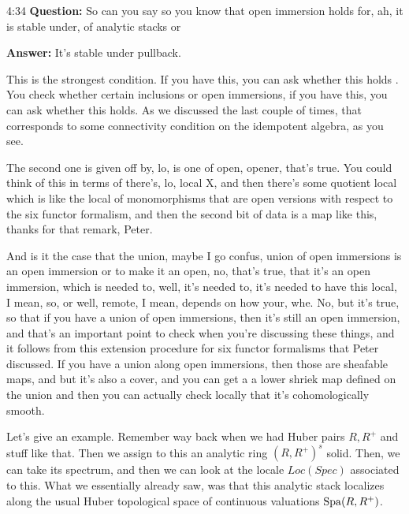 \begin{unfinished}{4:34}
\textbf{Question:} So can you say so you know that open immersion holds for, ah, it is stable under, of analytic stacks or 

\textbf{Answer:} It's stable under pullback.

This is the strongest condition. If you have this, you can ask whether this holds . You check whether certain inclusions or open immersions, if you have this, you can ask whether this holds. As we discussed the last couple of times, that corresponds to some connectivity condition on the idempotent algebra, as you see. 


The second one is given off by, lo, is one of open, opener, that's true. You could think of this in terms of there's, lo, local X, and then there's some quotient local which is like the local of monomorphisms that are open versions with respect to the six functor formalism, and then the second bit of data is a map like this, thanks for that remark, Peter.

And is it the case that the union, maybe I go confus, union of open immersions is an open immersion or to make it an open, no, that's true, that it's an open immersion, which is needed to, well, it's needed to, it's needed to have this local, I mean, so, or well, remote, I mean, depends on how your, whe. No, but it's true, so that if you have a union of open immersions, then it's still an open immersion, and that's an important point to check when you're discussing these things, and it follows from this extension procedure for six functor formalisms that Peter discussed.
If you have a union along open immersions, then those are sheafable maps, and but it's also a cover, and you can get a a lower shriek map defined on the union and then you can actually check locally that it's cohomologically smooth.


\begin{example}

Let's give an example. Remember way back when we had Huber pairs $R, R^{+}$ and stuff like that. Then we assign to this an analytic ring $(R, R^{+})^s$  solid. Then, we can take its spectrum, and then we can look at the locale $Loc(Spec)$ associated to this. What we essentially already saw, was that this analytic stack localizes along the usual Huber topological space of continuous valuations $\operatorname{Spa}(R, R^{+})$.
\end{example}


\end{unfinished}
